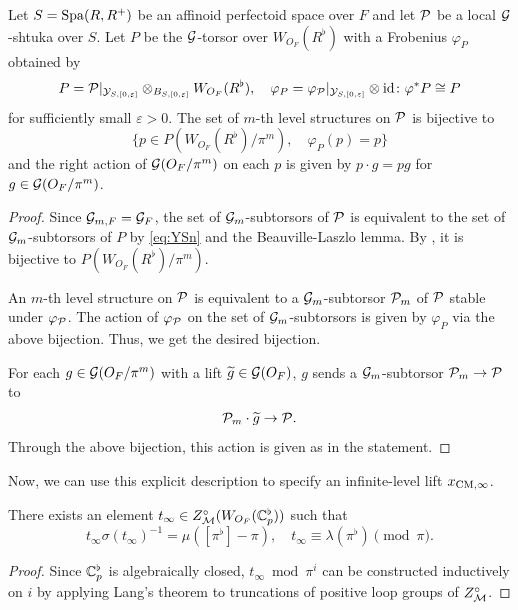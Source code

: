 \documentclass[12pt,reqno]{amsart}
\begin{document}
\begin{lem} \label{lem:finetdesc}
    Let $S = {\operatorname{Spa}}(R,R^+)$ be an affinoid perfectoid space over $F$ and let ${\mathcal{P}}$ be a local ${\mathcal{G}}$-shtuka over $S$. Let $P$ be the ${\mathcal{G}}$-torsor over $W_{O_F}(R^\flat)$ with a Frobenius $\varphi_P$ obtained by 
    \[
        P = {\mathcal{P}}\vert_{{\mathcal{Y}}_{S, [0, \varepsilon]}} \otimes_{B_{S, [0, \varepsilon]}} W_{O_F}(R^\flat), \quad
        \varphi_P = \varphi_{{\mathcal{P}}}\vert_{{\mathcal{Y}}_{S, [0, \varepsilon]}} \otimes {\operatorname{id}} \colon \varphi^*P \cong P
    \]
    for sufficiently small $\varepsilon > 0$. The set of $m$-th level structures on ${\mathcal{P}}$ is bijective to
    \[
        \{ 
            p \in P(W_{O_F}(R^\flat)/\pi^m) , \quad \varphi_P(p) = p
        \}
    \]
    and the right action of ${\mathcal{G}}(O_F / \pi^m)$ on each $p$ is given by $p \cdot g = pg$ for $g \in {\mathcal{G}}(O_F / \pi^m)$. 
\end{lem}
\begin{proof}
    Since ${\mathcal{G}}_{m, F} = {\mathcal{G}}_F$, the set of ${\mathcal{G}}_m$-subtorsors of ${\mathcal{P}}$ is equivalent to the set of ${\mathcal{G}}_m$-subtorsors of $P$ by \eqref{eq:YSn} and the Beauville-Laszlo lemma. By , it is bijective to $P(W_{O_F}(R^\flat) / \pi^m)$. 

    An $m$-th level structure on ${\mathcal{P}}$ is equivalent to a ${\mathcal{G}}_m$-subtorsor ${\mathcal{P}}_m$ of ${\mathcal{P}}$ stable under $\varphi_{{\mathcal{P}}}$. The action of $\varphi_{{\mathcal{P}}}$ on the set of ${\mathcal{G}}_m$-subtorsors is given by $\varphi_P$ via the above bijection. Thus, we get the desired bijection. 

    For each $g \in {\mathcal{G}}(O_F / \pi^m)$ with a lift ${\widetilde{g}} \in {\mathcal{G}}(O_F)$, $g$ sends a ${\mathcal{G}}_m$-subtorsor ${\mathcal{P}}_m \to {\mathcal{P}}$ to 
    \[
        {\mathcal{P}}_m\cdot {\widetilde{g}} \to {\mathcal{P}}. 
    \]   
    Through the above bijection, this action is given as in the statement. 
\end{proof}

Now, we can use this explicit description to specify an infinite-level lift $x_{{\operatorname{CM}}, \infty}$. 

\begin{prop} \label{defi:tinfty}
    There exists an element $t_\infty \in Z^\circ_{{\mathcal{M}}}(W_{O_F}(\mathbb{C}_p^\flat))$ such that
    \[
        t_\infty \sigma(t_\infty)^{-1} = \mu([\pi^\flat] - \pi) ,\quad 
        t_\infty \equiv \lambda(\pi^{\flat}) \pmod{\pi}. 
    \]
\end{prop}
\begin{proof}
    Since $\mathbb{C}_p^\flat$ is algebraically closed, $t_\infty \bmod \pi^i$ can be constructed inductively on $i$ by applying Lang's theorem to truncations of positive loop groups of $Z^\circ_{{\mathcal{M}}}$. 
\end{proof}
\end{document}
